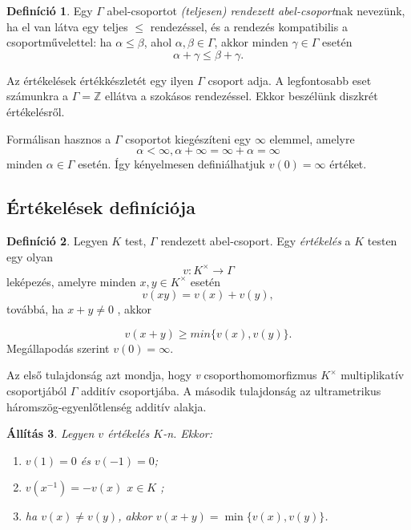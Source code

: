 \documentclass[11pt,a4paper]{article}
\theoremstyle{definition}
\newtheorem{definition}{Definíció}[section]
\theoremstyle{plain}
\newtheorem{proposition}[definition]{Állítás}
\begin{document}
{\begin{definition}
Egy $\Gamma$ abel-csoportot \textit{(teljesen) rendezett abel-csoport}nak nevezünk,
ha el van látva egy teljes {$\leq$} rendezéssel, és a rendezés kompatibilis
a csoportművelettel:  ha $\alpha \leq \beta$, ahol $\alpha, \beta \in \Gamma$,  akkor minden $\gamma \in \Gamma$ esetén
\begin{equation*}
    \alpha + \gamma \leq \beta + \gamma.
\end{equation*}

Az értékelések értékkészletét egy ilyen $\Gamma$ csoport adja. A legfontosabb
eset számunkra a $\Gamma = \mathbb{Z}$ ellátva a szokásos rendezéssel. Ekkor beszélünk
diszkrét értékelésről.

Formálisan hasznos a $\Gamma$ csoportot kiegészíteni egy $\infty$ elemmel, amelyre
\begin{equation*}
    \alpha < \infty, \alpha + \infty = \infty + \alpha = \infty
\end{equation*}
minden $\alpha \in \Gamma $ esetén. Így kényelmesen definiálhatjuk $v(0) = \infty$  értéket.
\end{definition}

\subsection{Értékelések definíciója}

\begin{definition} \label{valuation}
Legyen $K$ test, $\Gamma$ rendezett abel-csoport.
Egy \textit{értékelés} a $K$ testen egy olyan
\[
v : K^\times \longrightarrow  \Gamma
\]
leképezés,  amelyre minden $x, y \in K^\times$ esetén
\begin{equation*}
    v(xy) = v(x) + v(y),
\end{equation*}
továbbá, ha $x + y \not = 0$ , akkor

\begin{equation*}
    v(x+y) \geq min\{v(x), v(y)\}.
\end{equation*}
Megállapodás szerint $v(0) = \infty$.

Az első tulajdonság azt mondja, hogy \textit{v} csoporthomomorfizmus $K^\times$ multiplikatív csoportjából $\Gamma$ additív csoportjába. A második tulajdonság az
ultrametrikus háromszög-egyenlőtlenség additív alakja.
\end{definition}

\begin{proposition}
Legyen $v$ értékelés $K$-n. Ekkor:
\begin{enumerate}[label=\arabic*]
    \item $v(1)=0$  és $v(-1) = 0$;
    \item $v(x^{-1})=-v(x)$  $x \in K$ ;
    \item ha $v(x)\neq v(y)$, akkor
    $v(x+y)=\min\{v(x),v(y)\}$.
\end{enumerate}
\end{proposition}

}
\end{document}

